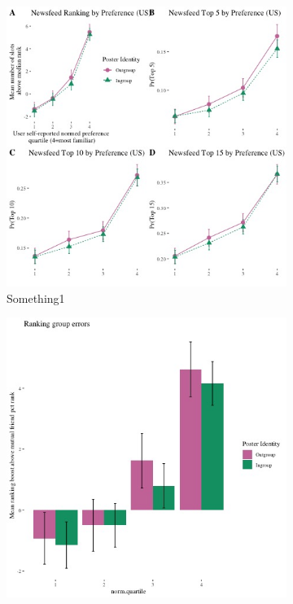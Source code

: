 \documentclass[12pt,letterpaper]{article}
\begin{document}
\begin{figure}[ht]

    \begin{subfigure}{.5\textwidth} 
        \centering
        \includegraphics[width=1\linewidth]{Output/Graphs/Audit/Ranking line graphs/US PYMK all outcomes panel by norm preference by ingroup.jpg} 
        \caption{Something1}
        \label{fig:sub-first}
        \end{subfigure}
    \begin{subfigure}{.5\textwidth}
        \centering
        \includegraphics[width=1\linewidth]{Output/Graphs/Audit/Misranking relative to expectation/Mutual friends expectation/US PYMK by norm pref.jpg}  

\end{subfigure}
\end{figure}
\end{document}
